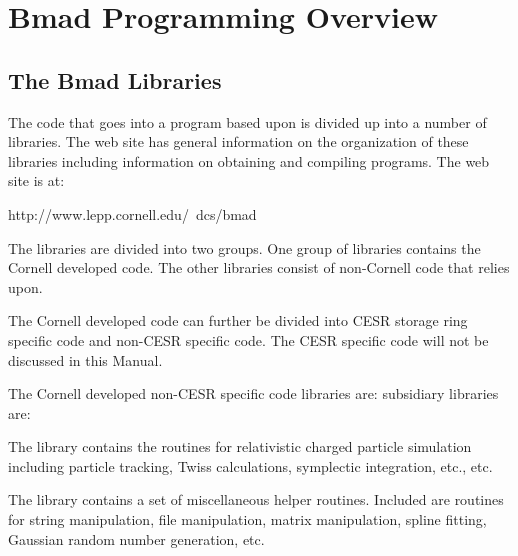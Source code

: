 \chapter{Bmad Programming Overview}
\label{c:programming}

\section {The Bmad Libraries}
\label{s:libs}

The code that goes into a program based upon \bmad is divided up into
a number of libraries. The \bmad web site has general information on
the organization of these libraries including information on obtaining
and compiling programs. The \bmad web site is at:
\begin{example}
    http://www.lepp.cornell.edu/~dcs/bmad
\end{example}

The \bmad libraries are divided into two groups. One group of
libraries contains the Cornell developed code. The other
 libraries consist of non-Cornell code that \bmad
relies upon.

The Cornell developed code can further be divided into CESR storage
ring specific code and non-CESR specific code. The CESR specific code
will not be discussed in this Manual.

The Cornell developed non-CESR specific code libraries are:
subsidiary libraries are: 
\begin{description}
  \item[bmad]
The  library contains the routines for relativistic charged
particle simulation including particle tracking, Twiss calculations,
symplectic integration, etc., etc.
  \item[sim_utils] 
The  library contains a set of miscellaneous helper routines. 
Included are routines for string manipulation, file manipulation,
matrix manipulation, spline fitting, Gaussian random number generation, etc. 
\end{description}


